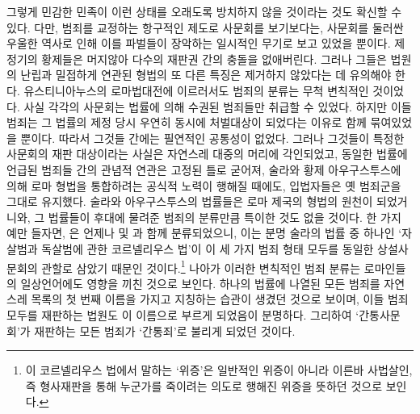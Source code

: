 그렇게 민감한 민족이
이런 상태를 오래도록 방치하지 않을 것이라는 것도
확신할 수 있다.
다만,
범죄를 교정하는 항구적인 제도로
사문회를
보기보다는,
사문회를 둘러싼 우울한 역사로 인해
이를 파벌들이 장악하는 일시적인 무기로 보고 있었을 뿐이다.
제정기의 황제들은 머지않아 다수의 재판권 간의 충돌을 없애버린다.
그러나 그들은 법원의 난립과 밀접하게 연관된 형법의 또 다른 특징은
제거하지 않았다는 데 유의해야 한다.
유스티니아누스의 로마법대전에 이르러서도
범죄의 분류는 무척 변칙적인 것이었다.
사실
각각의 사문회는
법률에 의해 수권된 범죄들만 취급할 수 있었다.
하지만 이들 범죄는
그 법률의 제정 당시
우연히
동시에 처벌대상이 되었다는 이유로
함께 묶여있었을 뿐이다.
따라서
그것들 간에는 필연적인 공통성이 없었다.
그러나
그것들이 특정한 사문회의 재판 대상이라는 사실은
자연스레 대중의 머리에 각인되었고,
동일한 법률에 언급된 범죄들 간의 관념적 연관은
고정된 틀로 굳어져,
술라와
황제 아우구스투스에 의해
로마 형법을 통합하려는 공식적 노력이 행해질 때에도,
입법자들은 옛 범죄군을
그대로 유지했다.
술라와 아우구스투스의 법률들은
로마 제국의 형법의 원천이 되었거니와,
그 법률들이 후대에 물려준 범죄의 분류만큼
특이한 것도 없을 것이다.
한 가지 예만 들자면,
은 언제나
 및
과 함께 분류되었으니,
이는 분명
술라의 법률 중 하나인
`자살범과 독살범에 관한
코르넬리우스 법'이
이 세 가지 범죄 형태 모두를 동일한 상설사문회의 관할로 삼았기
때문인 것이다.\footnote{%
  이 코르넬리우스 법에서 말하는 `위증'은 일반적인 위증이 아니라
  이른바 사법살인, 즉 형사재판을 통해 누군가를 죽이려는 의도로
  행해진 위증을 뜻하던 것으로 보인다.
   }
나아가
이러한 변칙적인 범죄 분류는 로마인들의 일상언어에도 영향을 끼친 것으로 보인다.
하나의 법률에 나열된 모든 범죄를
자연스레
목록의 첫 번째 이름을 가지고 지칭하는 습관이 생겼던 것으로 보이며,
이들 범죄 모두를 재판하는 법원도 이 이름으로  부르게 되었음이 분명하다.
그리하여
`간통사문회'가 재판하는
모든 범죄가 `간통죄'로 불리게 되었던 것이다.


